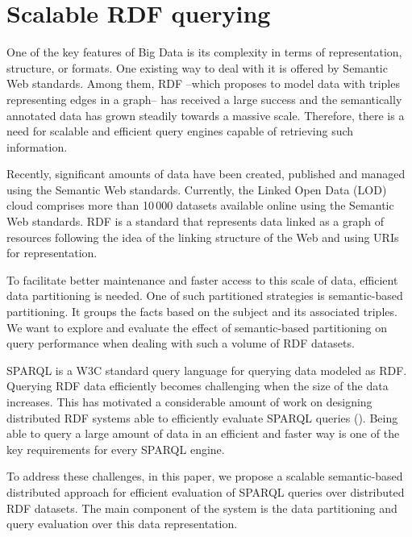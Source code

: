 \chapter{Scalable RDF querying} %
\label{chapter:scalable_rdf_querying}
One of the key features of Big Data is its complexity in terms of representation, structure, or formats.
One existing way to deal with it is offered by Semantic Web standards.
Among them, RDF --which proposes to model data with triples representing edges in a graph-- has received a large success and the semantically annotated data has grown steadily towards a massive scale.
Therefore, there is a need for scalable and efficient query engines capable of retrieving such information.

Recently, significant amounts of data have been created, published and managed using the Semantic Web standards.
Currently, the Linked Open Data (LOD) cloud comprises more than 10\,000 datasets available online using the Semantic Web standards. 
RDF is a standard that represents data linked as a graph of resources following the idea of the linking structure of the Web and using URIs for representation.

To facilitate better maintenance and faster access to this scale of data, efficient data partitioning is needed.
One of such partitioned strategies is semantic-based partitioning. 
It groups the facts based on the subject and its associated triples.
We want to explore and evaluate the effect of semantic-based partitioning on query performance when dealing with such a volume of RDF datasets.

SPARQL is a W3C standard query language for querying data modeled as RDF.
Querying RDF data efficiently becomes challenging when the size of the data increases.
This has motivated a considerable amount of work on designing distributed RDF systems able to efficiently evaluate SPARQL queries (\cite{Schatzle:2016:SRQ:2977797.2977806,sparqlgx-iswc-2016,2019-sansa-sparklify-iswc}).
Being able to query a large amount of data in an efficient and faster way is one of the key requirements for every SPARQL engine.

To address these challenges, in this paper, we propose a scalable semantic-based distributed approach for efficient evaluation of SPARQL queries over distributed RDF datasets. 
The main component of the system is the data partitioning and query evaluation over this data representation.

